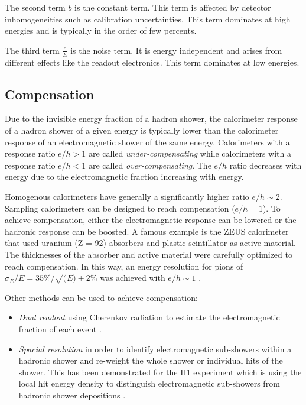 The second term $b$ is the constant term. This term is affected by detector inhomogeneities such as calibration uncertainties. This term dominates at high energies and is typically in the order of few percents.

The third term $\frac{c}{E}$ is the noise term. It is energy independent and arises from different effects like the readout electronics. This term dominates at low energies.

\subsection{Compensation}
\label{subsec:Compensation}

Due to the invisible energy fraction of a hadron shower, the calorimeter response of a hadron shower of a given energy is typically lower than the calorimeter response of an electromagnetic shower of the same energy. Calorimeters with a response ratio $e/h > 1$ are called \textit{under-compensating} while calorimeters with a response ratio $e/h < 1$ are called \textit{over-compensating}. The $e/h$ ratio decreases with energy due to the electromagnetic fraction increasing with energy.

Homogenous calorimeters have generally a significantly higher ratio $e/h \sim 2$. Sampling calorimeters can be designed to reach compensation ($e/h = 1$). To achieve compensation, either the electromagnetic response can be lowered or the hadronic response can be boosted. A famous example is the ZEUS calorimeter that used uranium (Z = 92) absorbers and plastic scintillator as active material. The thicknesses of the absorber and active material were carefully optimized to reach compensation. In this way, an energy resolution for pions of $\sigma_E/E = 35\%/\sqrt(E) + 2\%$ was achieved with $e/h \sim 1$ \cite{BERNSTEIN199323}.

Other methods can be used to achieve compensation:
\begin{itemize}
  \item \textit{Dual readout} using Cherenkov radiation to estimate the electromagnetic fraction of each event \cite{Akchurin:2013yaa}.
  \item \textit{Spacial resolution} in order to identify electromagnetic sub-showers within a hadronic shower and re-weight the whole shower or individual hits of the shower. This has been demonstrated for the H1 experiment which is using the local hit energy density to distinguish electromagnetic sub-showers from hadronic shower depositions \cite{Schacht:1990zw}.
\end{itemize}

